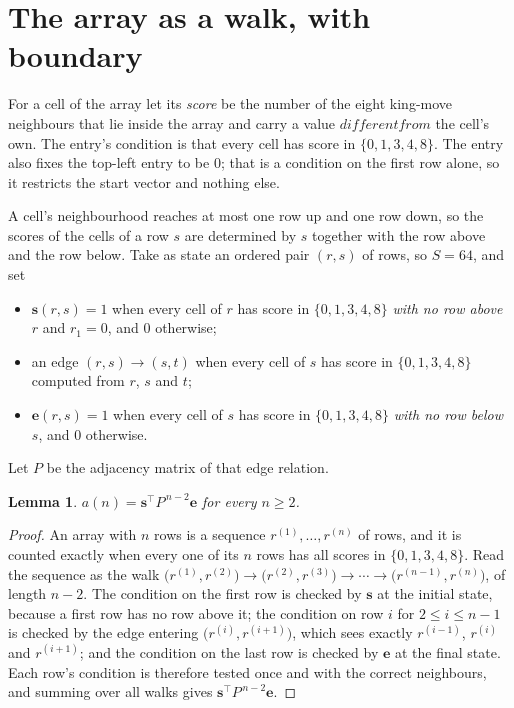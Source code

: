 \documentclass[11pt,a4paper]{article}
\theoremstyle{plain}
\newtheorem{lemma}[theorem]{Lemma}
\theoremstyle{definition}
\begin{document}
\section{The array as a walk, with boundary}

For a cell of the array let its \emph{score} be the number of the eight king-move neighbours that lie inside
the array and carry a value $different from$ the cell's own. The entry's condition is that every cell
has score in $\{0,1,3,4,8\}$. The entry also fixes the top-left entry to be $0$; that is a condition on the first row alone, so it restricts the start vector and nothing else.

A cell's neighbourhood reaches at most one row up and one row down, so the scores of the
cells of a row $s$ are determined by $s$ together with the row above and the row below.
Take as state an ordered pair $(r,s)$ of rows, so $S=64$, and set
\begin{itemize}
\item $\mathbf{s}(r,s)=1$ when every cell of $r$ has score in $\{0,1,3,4,8\}$ \emph{with no row
above $r$} and $r_1=0$, and $0$ otherwise;
\item an edge $(r,s)\to(s,t)$ when every cell of $s$ has score in $\{0,1,3,4,8\}$ computed from
$r$, $s$ and $t$;
\item $\mathbf{e}(r,s)=1$ when every cell of $s$ has score in $\{0,1,3,4,8\}$ \emph{with no row
below $s$}, and $0$ otherwise.
\end{itemize}
Let $P$ be the adjacency matrix of that edge relation.

\begin{lemma}\label{lem:walk}
$a(n)=\mathbf{s}^{\!\top}P^{\,n-2}\mathbf{e}$ for every $n\ge2$.
\end{lemma}

\begin{proof}
An array with $n$ rows is a sequence $r^{(1)},\dots,r^{(n)}$ of rows, and it is counted
exactly when every one of its $n$ rows has all scores in $\{0,1,3,4,8\}$. Read the sequence as the
walk $\bigl(r^{(1)},r^{(2)}\bigr)\to\bigl(r^{(2)},r^{(3)}\bigr)\to\cdots\to
\bigl(r^{(n-1)},r^{(n)}\bigr)$, of length $n-2$. The condition on the first row is
checked by $\mathbf{s}$ at the initial state, because a first row has no row above it; the
condition on row $i$ for $2\le i\le n-1$ is checked by the edge entering
$\bigl(r^{(i)},r^{(i+1)}\bigr)$, which sees exactly $r^{(i-1)}$, $r^{(i)}$ and
$r^{(i+1)}$; and the condition on the last row is checked by $\mathbf{e}$ at the final
state. Each row's condition is therefore tested once and with the correct neighbours, and
summing over all walks gives $\mathbf{s}^{\!\top}P^{\,n-2}\mathbf{e}$.
\end{proof}
\end{document}
